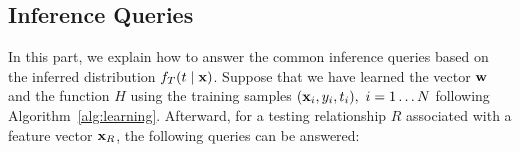 

\subsection{Inference Queries}
In this part, we explain how to answer the common inference queries based on the inferred distribution $f_T(t\mid \mathbf{x})$. Suppose that we have learned the vector ${\mathbf{w}}$ and the function ${H}$ using the training samples $(\mathbf{x}_i, y_i, t_i),\ i=1\dots N$ following Algorithm~\ref{alg:learning}. Afterward, for a testing relationship $R$ associated with a feature vector $\mathbf{x}_R$, the following queries can be answered:\\


